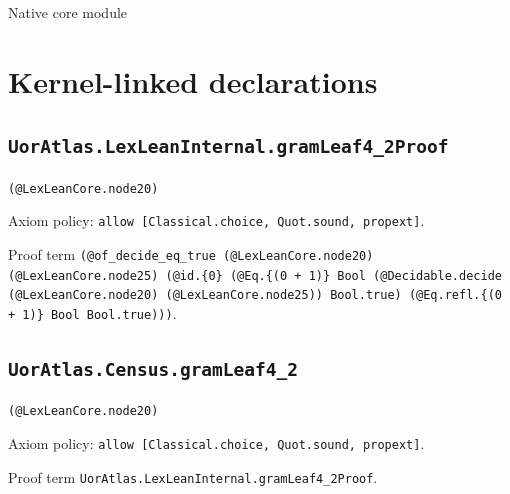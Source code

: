\documentclass[11pt]{article}
\begin{document}
\begin{center}{\LARGE Native core module}\end{center}
\section*{Kernel-linked declarations}
\subsection*{\texttt{UorAtlas.LexLeanInternal.gramLeaf4\_2Proof}}
\noindent\texttt{(@LexLeanCore.node20)}\par
\noindent Axiom policy: \texttt{allow [Classical.choice, Quot.sound, propext]}.\par
\noindent Proof term \texttt{(@of\_decide\_eq\_true (@LexLeanCore.node20) (@LexLeanCore.node25) (@id.\{0\} (@Eq.\{(0 + 1)\} Bool (@Decidable.decide (@LexLeanCore.node20) (@LexLeanCore.node25)) Bool.true) (@Eq.refl.\{(0 + 1)\} Bool Bool.true)))}.\par
\subsection*{\texttt{UorAtlas.Census.gramLeaf4\_2}}
\noindent\texttt{(@LexLeanCore.node20)}\par
\noindent Axiom policy: \texttt{allow [Classical.choice, Quot.sound, propext]}.\par
\noindent Proof term \texttt{UorAtlas.LexLeanInternal.gramLeaf4\_2Proof}.\par
\end{document}
